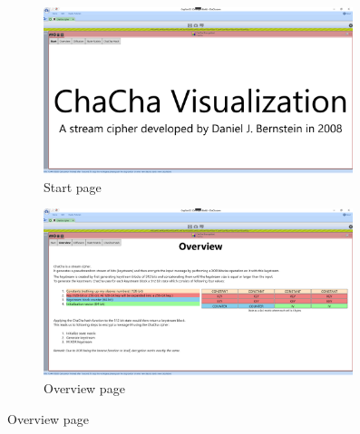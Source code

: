 \begin{figure}
\centering
\begin{subfigure}{.5\textwidth}
  \centering
  \includegraphics[width=0.99\textwidth]{figures/all-pages/1-start}
  \caption{Start page}
\end{subfigure}%
\begin{subfigure}{.5\textwidth}
  \centering
  \includegraphics[width=0.99\textwidth]{figures/all-pages/2-overview}
  \caption{Overview page}
\end{subfigure}


\end{figure}
